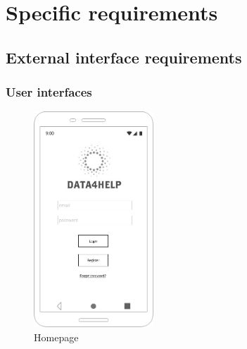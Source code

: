 \section{Specific requirements}
\label{sec:specreq}
  \subsection{External interface requirements}
    \subsubsection{User interfaces}
    \label{sec:userinterfaces}

\begin{figure}[h!]
	\centering
      \includegraphics[width=0.4\textwidth]{img/mockup/homepage.jpg}
  \caption{Homepage}
\end{figure}

